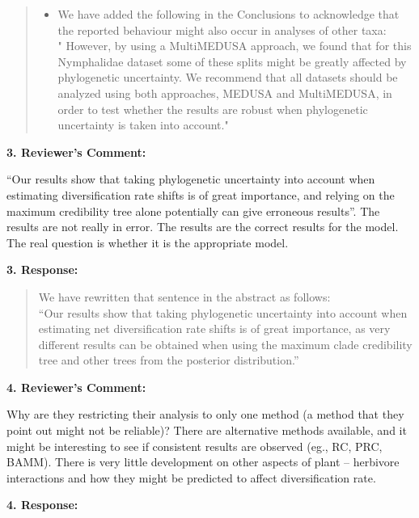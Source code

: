 \documentclass[]{article}
\begin{document}
\begin{quote}
\color{blue}
\begin{itemize}
\itemsep1pt\parskip0pt
\item
  We have added the following in the Conclusions to acknowledge that the
  reported behaviour might also occur in analyses of other taxa:\\"
  However, by using a MultiMEDUSA approach, we found that for this
  Nymphalidae dataset some of these splits might be greatly affected by
  phylogenetic uncertainty. We recommend that all datasets should be
  analyzed using both approaches, MEDUSA and MultiMEDUSA, in order to
  test whether the results are robust when phylogenetic uncertainty is
  taken into account."
\end{itemize}
\end{quote}

\textbf{3. Reviewer's Comment:}

``Our results show that taking phylogenetic uncertainty into account
when estimating diversification rate shifts is of great importance, and
relying on the maximum credibility tree alone potentially can give
erroneous results''. The results are not really in error. The results
are the correct results for the model. The real question is whether it
is the appropriate model.

\textbf{3. Response:}

\begin{quote}
\color{blue}
We have rewritten that sentence in the abstract as follows:\\``Our
results show that taking phylogenetic uncertainty into account when
estimating net diversification rate shifts is of great importance, as
very different results can be obtained when using the maximum clade
credibility tree and other trees from the posterior distribution.''
\end{quote}

\textbf{4. Reviewer's Comment:}

Why are they restricting their analysis to only one method (a method
that they point out might not be reliable)? There are alternative
methods available, and it might be interesting to see if consistent
results are observed (eg., RC, PRC, BAMM). There is very little
development on other aspects of plant -- herbivore interactions and how
they might be predicted to affect diversification rate.

\textbf{4. Response:}
\end{document}
